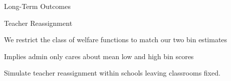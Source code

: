 \documentclass[t,aspectratio=169,11pt,presentation]{beamer}
\newenvironment{wideitemize}{\itemize\addtolength{\itemsep}{14pt}}{\enditemize}
\begin{document}
\begin{frame}{Long-Term Outcomes}

    
    
    


\end{frame}



\begin{frame}{Teacher Reassignment}
\begin{wideitemize}
    \item We restrict the class of welfare functions to match our two bin estimates 
    \item Implies admin only cares about mean low and high bin scores 
    \item Simulate teacher reassignment within schools leaving classrooms fixed. 
\end{wideitemize}

\end{frame}


\end{document}
